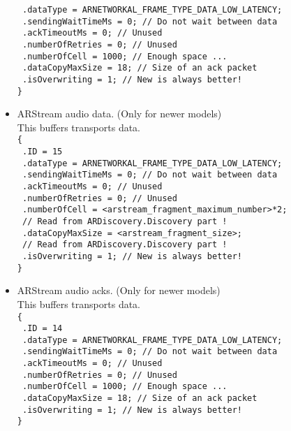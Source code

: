 \begin{itemize}
{    \texttt{  .dataType = ARNETWORKAL\_FRAME\_TYPE\_DATA\_LOW\_LATENCY;}\\
    \texttt{  .sendingWaitTimeMs = 0; // Do not wait between data}\\
    \texttt{  .ackTimeoutMs = 0; // Unused}\\
    \texttt{  .numberOfRetries = 0; // Unused}\\
    \texttt{  .numberOfCell = 1000; // Enough space ...}\\
    \texttt{  .dataCopyMaxSize = 18; // Size of an ack packet}\\
    \texttt{  .isOverwriting = 1; // New is always better!}\\
    \texttt{\}}
}
\item{
    ARStream audio data. (Only for newer models)\\
    This buffers transports  data.\\
    \texttt{\{}\\
    \texttt{  .ID = 15}\\
    \texttt{  .dataType = ARNETWORKAL\_FRAME\_TYPE\_DATA\_LOW\_LATENCY;}\\
    \texttt{  .sendingWaitTimeMs = 0; // Do not wait between data}\\
    \texttt{  .ackTimeoutMs = 0; // Unused}\\
    \texttt{  .numberOfRetries = 0; // Unused}\\
    \texttt{  .numberOfCell = <arstream\_fragment\_maximum\_number>*2;}\\
    \texttt{                  // Read from ARDiscovery.Discovery part !}\\
    \texttt{  .dataCopyMaxSize = <arstream\_fragment\_size>;}\\
    \texttt{                     // Read from ARDiscovery.Discovery part !}\\
    \texttt{  .isOverwriting = 1; // New is always better!}\\
    \texttt{\}}
}
\item{
    ARStream audio acks. (Only for newer models)\\
    This buffers transports  data.\\
    \texttt{\{}\\
    \texttt{  .ID = 14}\\
    \texttt{  .dataType = ARNETWORKAL\_FRAME\_TYPE\_DATA\_LOW\_LATENCY;}\\
    \texttt{  .sendingWaitTimeMs = 0; // Do not wait between data}\\
    \texttt{  .ackTimeoutMs = 0; // Unused}\\
    \texttt{  .numberOfRetries = 0; // Unused}\\
    \texttt{  .numberOfCell = 1000; // Enough space ...}\\
    \texttt{  .dataCopyMaxSize = 18; // Size of an ack packet}\\
    \texttt{  .isOverwriting = 1; // New is always better!}\\
    \texttt{\}}
}
\end{itemize}

